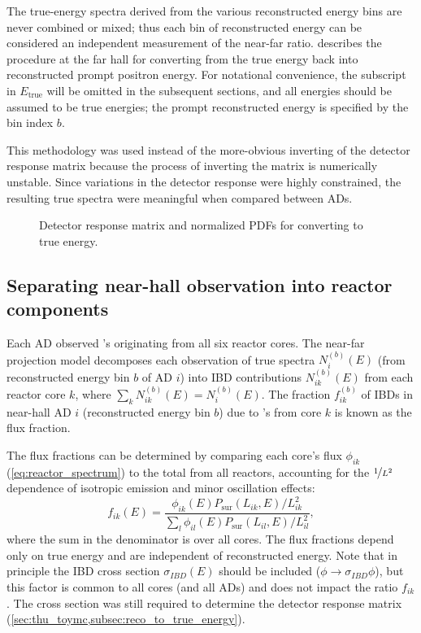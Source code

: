 The true-energy spectra derived from the various reconstructed energy bins
are never combined or mixed;
thus each bin of reconstructed energy can be considered an independent measurement
of the near-far ratio.
 describes the procedure at the far hall
for converting from the true \nuebar{} energy back into reconstructed prompt positron energy.
For notational convenience, the subscript in $E_{\text{true}}$ will be omitted
in the subsequent sections,
and all energies should be assumed to be true \nuebar{} energies;
the prompt reconstructed energy is specified by the bin index $b$.

This methodology was used instead of the more-obvious
inverting of the detector response matrix
because the process of inverting the matrix is numerically unstable.
Since variations in the detector response were highly constrained,
the resulting true \nuebar{} spectra were meaningful when compared between ADs.


\begin{figure}
    \caption{Detector response matrix and normalized PDFs
    for converting to true \nuebar{} energy.}
    \label{fig:drm}
\end{figure}


\subsection{Separating near-hall observation into reactor components}
\label{subsec:flux_fraction}

Each AD observed \nuebar{}'s originating from all six reactor cores.
The near-far projection model decomposes each observation
of true \nuebar{} spectra $N_i^{(b)}(E)$
(from reconstructed energy bin $b$ of AD $i$)
into IBD contributions $N_{ik}^{(b)}(E)$ from each reactor core $k$,
where $\sum_k N_{ik}^{(b)}(E) = N_i^{(b)}(E)$.
The fraction $f_{ik}^{(b)}$ of IBDs in near-hall AD $i$
(reconstructed energy bin $b$)
due to \nuebar{}'s from core $k$ is known as the flux fraction.

The flux fractions can be determined
by comparing each core's \nuebar{} flux $\phi_{ik}$ (\cref{eq:reactor_spectrum})
to the total from all reactors,
accounting for the $\nicefrac{1}{L^2}$ dependence of isotropic \nuebar{} emission
and minor oscillation effects:
\begin{equation}\label{eq:flux_fraction}
    f_{ik}(E) = \frac{\phi_{ik}(E)P_\text{sur}(L_{ik}, E)/L_{ik}^2}{
        \sum_l \phi_{il}(E)P_\text{sur}(L_{il}, E)/L_{il}^2
    },
\end{equation}
where the sum in the denominator is over all cores.
The flux fractions depend only on true \nuebar{} energy
and are independent of reconstructed energy.
Note that in principle the IBD cross section $\sigma_{IBD}(E)$
should be included ($\phi \to \sigma_{IBD}\phi$),
but this factor is common to all cores (and all ADs)
and does not impact the ratio $f_{ik}$.
The cross section was still required to determine the detector response matrix
(\cref{sec:thu_toymc,subsec:reco_to_true_energy}).

